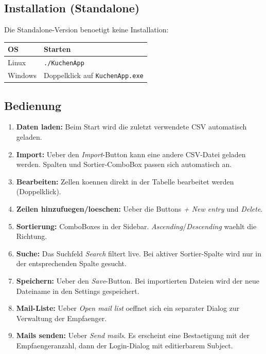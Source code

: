 \documentclass[12pt, a4paper]{article}
\begin{document}
\subsection{Installation (Standalone)}

Die Standalone-Version benoetigt keine Installation:

\begin{table}[ht!]
\centering
{}
\begin{tabularx}{0.7\textwidth}{lX}
\toprule
\textbf{OS} & \textbf{Starten} \\
\midrule
Linux & \texttt{./KuchenApp} \\
Windows & Doppelklick auf \texttt{KuchenApp.exe} \\
\bottomrule
\end{tabularx}
\end{table}

\subsection{Bedienung}

\begin{enumerate}[leftmargin=1.5em]
    \item \textbf{Daten laden:} Beim Start wird die zuletzt verwendete CSV
        automatisch geladen.
    \item \textbf{Import:} Ueber den \emph{Import}-Button kann eine andere
        CSV-Datei geladen werden. Spalten und Sortier-ComboBox passen
        sich automatisch an.
    \item \textbf{Bearbeiten:} Zellen koennen direkt in der Tabelle
        bearbeitet werden (Doppelklick).
    \item \textbf{Zeilen hinzufuegen/loeschen:} Ueber die Buttons
        \emph{+ New entry} und \emph{Delete}.
    \item \textbf{Sortierung:} ComboBoxes in der Sidebar.
        \emph{Ascending}/\emph{Descending} waehlt die Richtung.
    \item \textbf{Suche:} Das Suchfeld \emph{Search} filtert live. Bei aktiver
        Sortier-Spalte wird nur in der entsprechenden Spalte gesucht.
    \item \textbf{Speichern:} Ueber den \emph{Save}-Button. Bei importierten
        Dateien wird der neue Dateiname in den Settings gespeichert.
    \item \textbf{Mail-Liste:} Ueber \emph{Open mail list} oeffnet sich
        ein separater Dialog zur Verwaltung der Empfaenger.
    \item \textbf{Mails senden:} Ueber \emph{Send mails}. Es erscheint eine
        Bestaetigung mit der Empfaengeranzahl, dann der Login-Dialog mit
        editierbarem Subject.
\end{enumerate}
\end{document}
